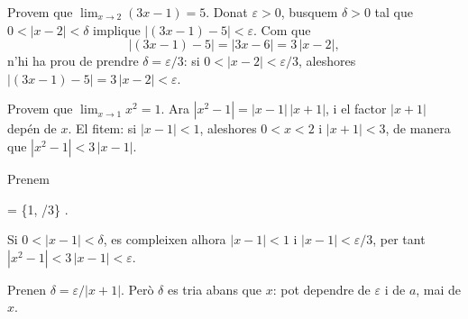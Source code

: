 
\begin{frame}

\begin{example}
Provem que $\lim_{x \to 2} (3x - 1) = 5$. Donat $\varepsilon > 0$, busquem
$\delta > 0$ tal que $0 < |x - 2| < \delta$ implique
$|(3x - 1) - 5| < \varepsilon$. Com que
\[
  |(3x - 1) - 5| = |3x - 6| = 3\,|x - 2| ,
\]
n'hi ha prou de prendre $\delta = \varepsilon / 3$: si
$0 < |x - 2| < \varepsilon/3$, aleshores $|(3x - 1) - 5| = 3\,|x - 2| <
\varepsilon$.
\end{example}

\end{frame}

\begin{frame}

\begin{example}
Provem que $\lim_{x \to 1} x^2 = 1$. Ara
$|x^2 - 1| = |x - 1|\,|x + 1|$, i el factor $|x + 1|$ depén de $x$. El fitem: si $|x - 1| < 1$, aleshores
$0 < x < 2$ i $|x + 1| < 3$, de manera que $|x^2 - 1| < 3\,|x - 1|$.

\dpause

Prenem
\begin{keyformula}
  \delta = \min\{1, \varepsilon/3\} .
\end{keyformula}
Si $0 < |x - 1| < \delta$, es compleixen alhora $|x - 1| < 1$ i
$|x - 1| < \varepsilon/3$, per tant $|x^2 - 1| < 3\,|x - 1| < \varepsilon$.
\end{example}

\begin{commonmistake}
Prenen $\delta = \varepsilon / |x + 1|$. Però $\delta$ es tria abans que $x$:
pot dependre de $\varepsilon$ i de $a$, mai de $x$.
\end{commonmistake}
\end{frame}
